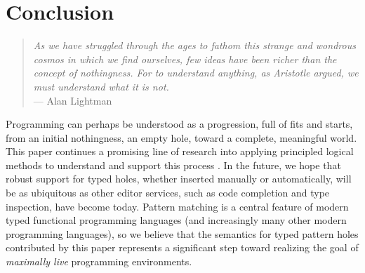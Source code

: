 \section{Conclusion}
\begin{quote}
    \emph{As we have struggled through the ages to fathom this strange and wondrous cosmos in which we find ourselves, few ideas have been richer than the concept of nothingness. For to understand anything, as Aristotle argued, we must understand what it is not.}
    \\\null\hfill --- Alan Lightman
\end{quote}

\noindent
Programming can perhaps be understood as a progression, full of fits and starts, from an initial nothingness, an empty hole, toward a complete, meaningful world. This paper continues a promising line of research into applying principled logical methods to understand and support this process \cite{DBLP:conf/popl/OmarVHAH17,HazelnutSNAPL}. In the future, we hope that robust support for typed holes, whether inserted manually or automatically, will be as ubiquitous as other editor services, such as code completion and type inspection, have become today. 
Pattern matching is a central feature of modern typed functional programming languages (and increasingly many other modern 
programming languages), so we believe that the semantics for typed pattern holes contributed by this paper represents a significant step toward realizing the goal of \emph{maximally live} programming environments.



